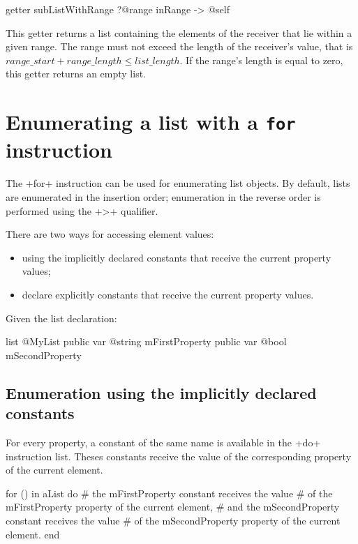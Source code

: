 \begin{galgas}
getter subListWithRange
  ?@range inRange
  -> @self
\end{galgas}

This getter returns a list containing the elements of the receiver that lie within a given range. The range must not exceed the length of the receiver's value, that is $range\_start + range\_length \leqslant list\_length$. If the range's length is equal to zero, this getter returns an empty list.















\section{Enumerating a list with a \texttt{for} instruction}

The \ggs+for+ instruction can be used for enumerating list objects. By default, lists are enumerated in the insertion order; enumeration in the reverse order is performed using the \ggs+>+ qualifier.

There are two ways for accessing element values:
\begin{itemize}
\item using the implicitly declared constants that receive the current property values;
\item declare explicitly constants that receive the current property values.
\end{itemize}

Given the list declaration:

\begin{galgas}
list @MyList {
  public var @string mFirstProperty
  public var @bool mSecondProperty
}
\end{galgas}

\subsection{Enumeration using the implicitly declared constants}

For every property, a constant of the same name is available in the \ggs+do+ instruction list. Theses constants receive the value of the corresponding property of the current element.

\begin{galgas}
for () in aList do
  # the mFirstProperty constant receives the value
  # of the mFirstProperty property of the current element,
  # and the mSecondProperty constant receives the value
  # of the mSecondProperty property of the current element.
end
\end{galgas}

